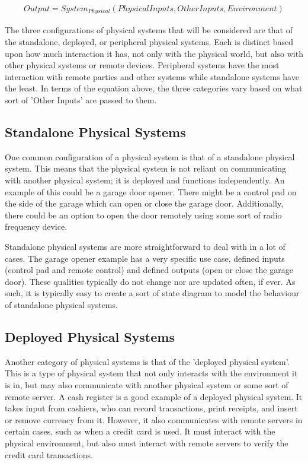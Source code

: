 \begin{align*}
Output = System_{Physical}(Physical Inputs, Other Inputs, Environment)
\end{align*}

The three configurations of physical systems that will be considered are that of the standalone, deployed, or peripheral physical
systems. Each is distinct based upon how much interaction it has, not only with the physical world, but also with other physical
systems or remote devices. Peripheral systems have the most interaction with remote parties and other systems while standalone
systems have the least. In terms of the equation above, the three categories vary based on what sort of 'Other Inputs' are passed
to them.

\subsection*{Standalone Physical Systems}
One common configuration of a physical system is that of a standalone physical system. This means that the
physical system is not reliant on communicating with another physical system; it is deployed and functions
independently. An example of this could be a garage door opener. There might be a control pad on the side of the
garage which can open or close the garage door. Additionally, there could be an option to open the door remotely
using some sort of radio frequency device.

Standalone physical systems are more straightforward to deal with in a lot of cases. The garage opener example has
a very specific use case, defined inputs (control pad and remote control) and defined outputs (open or close the garage
door). These qualities typically do not change nor are updated often, if ever. As such, it is typically easy to create a sort
of state diagram to model the behaviour of standalone physical systems.

\subsection*{Deployed Physical Systems}
Another category of physical systems is that of the 'deployed physical system'. This is a type of physical system that not only
interacts with the environment it is in, but may also communicate with another physical system or some sort of remote
server. A cash register is a good example of a deployed physical system. It takes input from cashiers, who can record transactions,
print receipts, and insert or remove currency from it. However, it also communicates with remote servers in certain cases, such
as when a credit card is used. It must interact with the physical environment, but also must interact with remote servers to verify
the credit card transactions.

